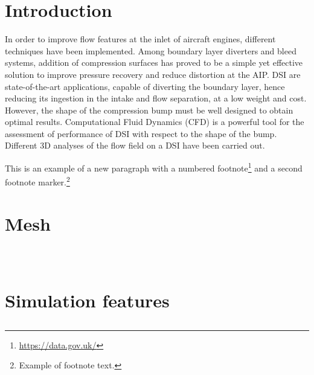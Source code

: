 \documentclass[12pt,a4paper]{article}
\newcommand{\subsubsubsection}[1]{%
  \vspace{\baselineskip}%
  \noindent\textbf{#1\\}\quad%
}
\begin{document}
\vspace{0.15cm}

\section{Introduction}
 In order to improve flow features at the inlet of aircraft engines, different techniques have been implemented. Among boundary layer diverters and bleed systems, addition of compression surfaces has proved to be a simple yet effective solution to improve pressure recovery and reduce distortion at the AIP. DSI are state-of-the-art applications, capable of diverting the boundary layer, hence reducing its ingestion in the intake and flow separation, at a low weight and cost. However, the shape of the compression bump must be well designed to obtain optimal results. Computational Fluid Dynamics (CFD) is a powerful tool for the assessment of performance of DSI with respect to the shape of the bump. Different 3D analyses of the flow field on a DSI have been carried out.

This is an example of a new paragraph with a numbered footnote\footnote{\url{https://data.gov.uk/}} and a second footnote marker.\footnote{Example of footnote text.}

\section{Mesh}\label{sec2}

\subsection{}

\subsection{}\label{subsec1}

\subsubsection{}\label{subsubsec1}

\subsubsubsection{}

\vspace{-1.5cm}
\section{Simulation features}\label{sec3}

\subsection{}\label{subsec2}
\end{document}
